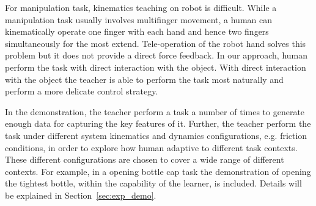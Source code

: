 \documentclass[preprint,12pt]{elsarticle}
\begin{document}
For manipulation task, kinematics teaching on robot is difficult. While a manipulation task usually involves multifinger movement, a human can kinematically operate one finger with each hand and hence two fingers simultaneously for the most extend. Tele-operation of the robot hand solves this problem but it does not provide a direct force feedback. In our approach, human perform the task with direct interaction with the object. With direct interaction with the object the teacher is able to perform the task most naturally and perform a more delicate control strategy. %


In the demonstration, the teacher perform a task a number of times to generate enough data for capturing the key features of it. Further, the teacher perform the task under different system kinematics and dynamics configurations, e.g. friction conditions, in order to explore how human adaptive to different task contexts. These different configurations are chosen to cover a wide range of different contexts. For example, in a opening bottle cap task the demonstration of opening the tightest bottle, within the capability of the learner, is included. Details will be explained in Section~\ref{sec:exp_demo}.



\end{document}
